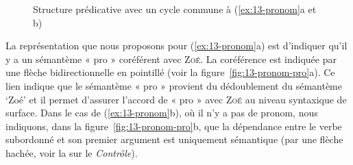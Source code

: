 \begin{figure}
\caption{Structure prédicative avec un cycle commune à (\ref{ex:13-pronom}a et b)\label{fig:13-pronom-sem}}
\end{figure}

La représentation que nous proposons pour (\ref{ex:13-pronom}a) est d’indiquer qu’il y a un sémantème « pro » coréférent avec \textsc{Zoé}. La coréférence est indiquée par une flèche bidirectionnelle en pointillé (voir la figure~\ref{fig:13-pronom-pro}a). Ce lien indique que le sémantème « pro » provient du dédoublement du sémantème ‘Zoé’ et il permet d’assurer l’accord de « pro » avec \textsc{Zoé} au niveau syntaxique de surface. Dans le cas de (\ref{ex:13-pronom}b), où il n’y a pas de pronom, nous indiquons, dans la figure~\ref{fig:13-pronom-pro}b, que la dépendance entre le verbe subordonné et son premier argument est uniquement sémantique (par une flèche hachée, voir la  sur le \textit{Contrôle}).

